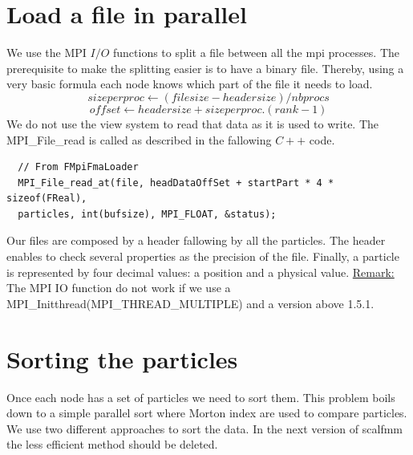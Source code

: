 \documentclass[12pt,letterpaper,titlepage]{report}
\begin{document}
\section{Load a file in parallel}
We use the MPI $I/O$ functions to split a file between all the mpi
processes.  The prerequisite to make the splitting easier is to have a
binary file.  Thereby, using a very basic formula each node knows
which part of the file it needs to load.
\begin{equation}
  size per proc \leftarrow \left (file size - header size \right ) / nbprocs
\end{equation}
\begin{equation}
  offset \leftarrow header size + size per proc .\left ( rank - 1 \right )
\end{equation}
\newline
We do not use the view system to read that data as it is used to
write. The MPI\_File\_read is called as described in the fallowing
$C++$ code.
\begin{lstlisting}
  // From FMpiFmaLoader
  MPI_File_read_at(file, headDataOffSet + startPart * 4 * sizeof(FReal),
  particles, int(bufsize), MPI_FLOAT, &status);
\end{lstlisting}
Our files are composed by a header fallowing by all the particles.
The header enables to check several properties as the precision of the file.
Finally, a particle is represented by four decimal values: a position and a physical value.
\newline
\underline{Remark:} The MPI IO function do not work if we use a MPI\_Initthread(MPI\_THREAD\_MULTIPLE) and a version above 1.5.1.

\section{Sorting the particles}
Once each node has a set of particles we need to sort them.  This
problem boils down to a simple parallel sort where Morton index are
used to compare particles.  We use two different approaches to sort
the data.  In the next version of scalfmm the less efficient method
should be deleted.
\end{document}
